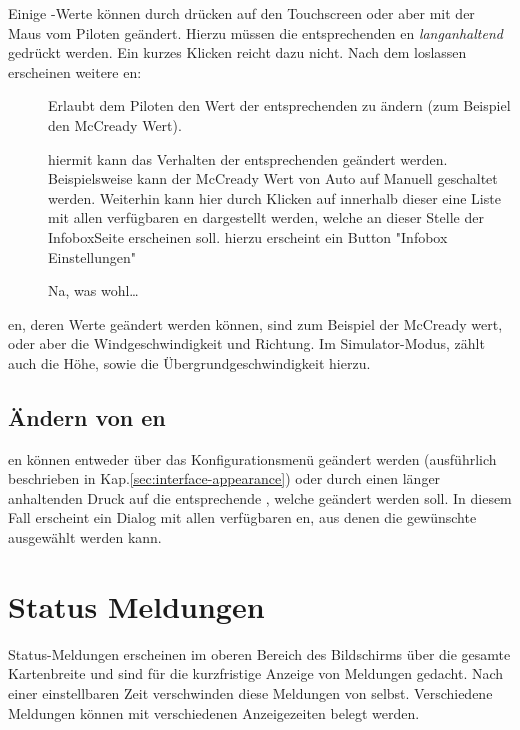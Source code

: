 Einige {\InfoBox}-Werte können durch drücken auf den Touchscreen oder aber mit der Maus vom Piloten geändert.
Hierzu müssen die entsprechenden {\InfoBox}en  \emph{langanhaltend} gedrückt werden.
Ein kurzes Klicken reicht dazu nicht.  Nach dem loslassen erscheinen weitere {\InfoBox}en:

\begin{description}
\item[]
Erlaubt dem Piloten den Wert der entsprechenden {\InfoBox} zu ändern (zum Beispiel den McCready Wert).

\item[]
hiermit kann das Verhalten der entsprechenden {\InfoBox} geändert werden. Beispielsweise kann der McCready Wert von Auto auf Manuell geschaltet werden.
Weiterhin kann hier durch Klicken auf   innerhalb dieser {\InfoBox}  eine Liste mit allen verfügbaren {\InfoBox}en dargestellt werden, welche an dieser Stelle der InfoboxSeite erscheinen soll. hierzu erscheint ein Button "Infobox Einstellungen"

\item[] Na, was wohl\dots
\end{description}

{\InfoBox}en, deren Werte geändert werden können, sind zum Beispiel der McCready wert, oder aber die Windgeschwindigkeit und Richtung. Im Simulator-Modus, zählt auch die Höhe, sowie die Übergrundgeschwindigkeit hierzu.

\subsection*{Ändern von {\InfoBox}en}
{\InfoBox}en können entweder über das Konfigurationsmenü geändert werden 
 (ausführlich beschrieben in Kap.\ref{sec:interface-appearance})
oder durch einen länger anhaltenden Druck auf die entsprechende  {\InfoBox}, welche geändert werden soll.
 In diesem Fall erscheint ein Dialog mit allen verfügbaren {\InfoBox}en, aus denen die gewünschte ausgewählt werden kann.
 

\section{Status Meldungen}
Status-Meldungen erscheinen im oberen Bereich des Bildschirms über die gesamte Kartenbreite und sind für die kurzfristige Anzeige von Meldungen gedacht. Nach einer einstellbaren Zeit verschwinden diese Meldungen von selbst. Verschiedene Meldungen können mit verschiedenen Anzeigezeiten belegt werden.

